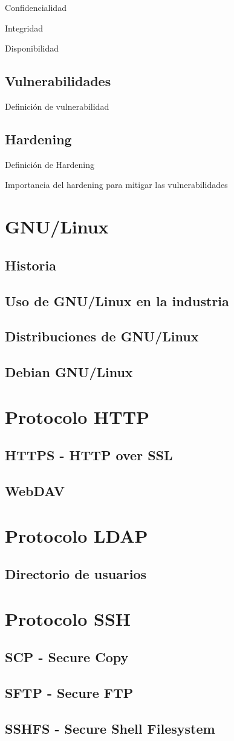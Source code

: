Confidencialidad

Integridad

Disponibilidad

      \subsection {Vulnerabilidades}

Definici\'{o}n de vulnerabilidad

      \subsection {Hardening}

Definici\'{o}n de Hardening

Importancia del hardening para mitigar las vulnerabilidades

    \section {GNU/Linux}
      \subsection {Historia}
      \subsection {Uso de GNU/Linux en la industria}
      \subsection {Distribuciones de GNU/Linux}
      \subsection {Debian GNU/Linux}
    \section {Protocolo HTTP}
      \subsection {HTTPS - HTTP over SSL}
      \subsection {WebDAV}
    \section {Protocolo LDAP}
      \subsection {Directorio de usuarios}
    \section {Protocolo SSH}
      \subsection {SCP - Secure Copy}
      \subsection {SFTP - Secure FTP}
      \subsection {SSHFS - Secure Shell Filesystem}
